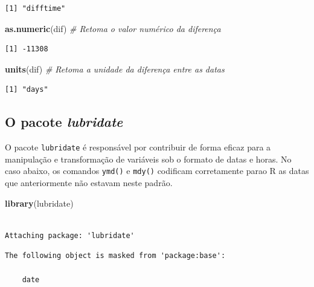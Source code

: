 \documentclass[12pt,brazil,oneside]{book}
\newenvironment{Shaded}{\begin{snugshade}}{\end{snugshade}}
\newcommand{\CommentTok}[1]{\textcolor[rgb]{0.56,0.35,0.01}{\textit{#1}}}
\newcommand{\KeywordTok}[1]{\textcolor[rgb]{0.13,0.29,0.53}{\textbf{#1}}}
\newcommand{\NormalTok}[1]{#1}
\begin{document}
\begin{verbatim}
[1] "difftime"
\end{verbatim}

\begin{Shaded}
\begin{Highlighting}[]
\KeywordTok{as.numeric}\NormalTok{(dif) }\CommentTok{# Retoma o valor numérico da diferença}
\end{Highlighting}
\end{Shaded}

\begin{verbatim}
[1] -11308
\end{verbatim}

\begin{Shaded}
\begin{Highlighting}[]
\KeywordTok{units}\NormalTok{(dif) }\CommentTok{# Retoma a unidade da diferença entre as datas}
\end{Highlighting}
\end{Shaded}

\begin{verbatim}
[1] "days"
\end{verbatim}

\hypertarget{o-pacote-lubridate}{%
\subsection{\texorpdfstring{O pacote \emph{lubridate}}{O pacote lubridate}}\label{o-pacote-lubridate}}

O pacote \texttt{lubridate} é responsável por contribuir de forma eficaz para a manipulação e transformação de variáveis sob o formato de datas e horas. No caso abaixo, os comandos \texttt{ymd()} e \texttt{mdy()} codificam corretamente parao R as datas que anteriormente não estavam neste padrão.

\begin{Shaded}
\begin{Highlighting}[]
\KeywordTok{library}\NormalTok{(lubridate)}
\end{Highlighting}
\end{Shaded}

\begin{verbatim}

Attaching package: 'lubridate'
\end{verbatim}

\begin{verbatim}
The following object is masked from 'package:base':

    date
\end{verbatim}
\end{document}
